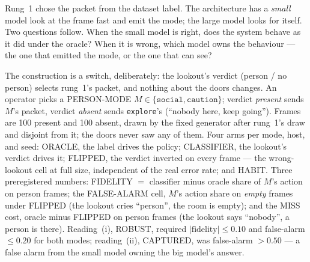 \documentclass[11pt]{article}
\begin{document}
Rung~1 chose the packet from the dataset label. The architecture has a
\emph{small} model look at the frame fast and emit the mode; the large
model looks for itself. Two questions follow. When the small model is
right, does the system behave as it did under the oracle? When it is
wrong, which model owns the behaviour --- the one that emitted the mode,
or the one that can see?

The construction is a switch, deliberately: the lookout's verdict
(person / no person) selects rung~1's packet, and nothing about the doors
changes. An operator picks a PERSON-MODE $M\in\{\texttt{social},
\texttt{caution}\}$; verdict \emph{present} sends $M$'s packet, verdict
\emph{absent} sends \texttt{explore}'s (``nobody here, keep going'').
Frames are 100 present and 100 absent, drawn by the fixed generator after
rung~1's draw and disjoint from it; the doors never saw any of them. Four
arms per mode, host, and seed: ORACLE, the label drives the policy;
CLASSIFIER, the lookout's verdict drives it; FLIPPED, the verdict
inverted on every frame --- the wrong-lookout cell at full size,
independent of the real error rate; and HABIT. Three preregistered
numbers: FIDELITY $=$ classifier minus oracle share of $M$'s action on
person frames; the FALSE-ALARM cell, $M$'s action share on \emph{empty}
frames under FLIPPED (the lookout cries ``person'', the room is empty);
and the MISS cost, oracle minus FLIPPED on person frames (the lookout
says ``nobody'', a person is there). Reading~(i), ROBUST, required
$|\text{fidelity}|\le 0.10$ and false-alarm $\le 0.20$ for both modes;
reading~(ii), CAPTURED, was false-alarm $> 0.50$ --- a false alarm from
the small model owning the big model's answer.
\end{document}
